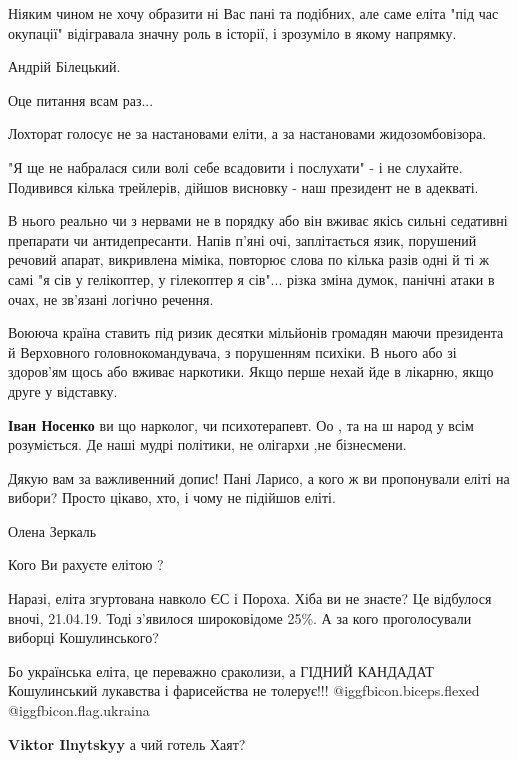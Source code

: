 \begin{itemize}
Ніяким чином не хочу образити ні Вас пані та подібних, але саме еліта "під час
окупації" відігравала значну роль в історії, і зрозуміло в якому напрямку.

Андрій Білецький.

Оце питання всам раз...

Лохторат голосує не за настановами еліти, а за настановами жидозомбовізора.


"Я ще не набралася сили волі себе всадовити і послухати" - і не слухайте.
Подивився кілька трейлерів, дійшов висновку - наш президент не в адекваті.

В нього реально чи з нервами не в порядку або він вживає якісь сильні седативні
препарати чи антидепресанти. Напів п'яні очі, заплітається язик, порушений
речовий апарат, викривлена міміка, повторює слова по кілька разів одні й ті ж
самі "я сів у гелікоптер, у гілекоптер я сів"... різка зміна думок, панічні
атаки в очах, не зв'язані логічно речення.

Воююча країна ставить під ризик десятки мільйонів громадян маючи президента й
Верховного головнокомандувача, з порушенням психіки. В нього або зі здоров'ям
щось або вживає наркотики. Якщо перше нехай йде в лікарню, якщо друге у
відставку.

\begin{itemize} %
\textbf{Іван Носенко} ви що нарколог, чи психотерапевт. Оо , та на ш народ у всім розуміється. Де наші мудрі політики, не олігархи ,не бізнесмени.
\end{itemize} %

Дякую вам за важливенний допис! Пані Ларисо, а кого ж ви пропонували еліті на вибори? Просто цікаво, хто, і чому не підійшов еліті.

Олена Зеркаль

Кого Ви рахуєте елітою ?


Наразі, еліта згуртована навколо ЄС і Пороха. Хіба ви не знаєте? Це відбулося
вночі, 21.04.19. Тоді з'явилося широковідоме 25\%. А за кого проголосували
виборці Кошулинського?


Бо українська еліта, це переважно сраколизи, а ГІДНИЙ КАНДАДАТ Кошулинський
лукавства і фарисейства не толерує!!! @igg{fbicon.biceps.flexed} @igg{fbicon.flag.ukraina}

\textbf{Viktor Ilnytskyy} а чий готель Хаят?

\end{itemize} %
